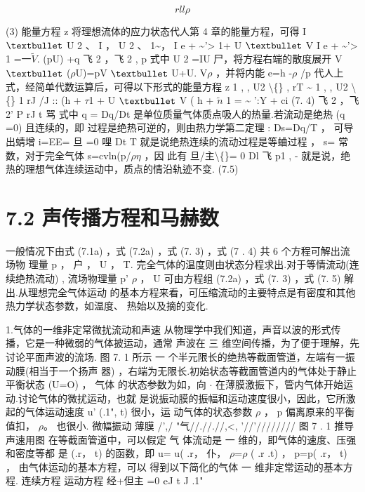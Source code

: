 \[rll\rho \]

(3) 能量方程 z 将理想流体的应力状态代人第 4 章的能量方程，可得 I ${\rm •}$ U 2 、 I ， U 2 、 1\textasciitilde{}， I e + \textasciitilde{}'> 1+ U ${\rm •}$ V I e + \textasciitilde{}'> 1 =一$\tilde{V}$. (pU) +q 飞 2 ，飞 2 , p 式中 U 2 =IU 尸，将方程右端的散度展开 V ${\rm •}$ ($\rho$U)=pV ${\rm •}$ U+U. V$\rho$ ，并将内能 e=h -$\rho$ /p 代人上式，经简单代数运算后，可得以下形式的能量方程 z 1 , , U2 \textbackslash\{\} , rT \textasciitilde{} 1 , , U2 \textbackslash\{\} 1 rJ /J :: (h + $\tau$1 + U ${\rm •}$ V ( h + $\tilde{n}$ 1 = \textasciitilde{} ':Y + ci (7. 4) 飞 2 ，飞 2' P rJ t 骂 式中 q = Dq/Dt 是单位质量气体质点吸人的热量.若流动是绝热 (q =0) 且连续的，即 过程是绝热可逆的，则由热力学第二定理 : Ds=Dq/T ， 可导出蜻增 i=EE= 旦 =0 哩 Dt T 就是说绝热连续的流动过程是等蛐过程 ， s= 常数，对于完全气体 s=cvln(p/$\rho$$\eta$ ，因 此有 旦/主\textbackslash\{\}= 0 Dl 飞 p1 , - 就是说，绝热的理想气体连续运动中，质点的情沿轨迹不变. (7.5)

\section*{7.2  声传播方程和马赫数}

一般情况下由式 (7.1a) ，式 (7.2a) ，式 (7. 3) ，式 (7 . 4) 共 6 个方程可解出流场物 理量 p ， 户 ， U ， T. 完全气体的温度则由状态分程求出.对于等情流动(连续绝热流动) , 流场物理量 p' $\rho$ ， U 可由方程组 (7.2a) ，式 (7. 3) ，式 (7. 5) 解出.从理想完全气体运动 的基本方程来看，可压缩流动的主要特点是有密度和其他热力学状态参数，如温度、 热始以及摘的变化.

1.气体的一维非定常微扰流动和声速 从物理学中我们知道，声音以波的形式传播，它是一种微弱的气体披运动，通常 声波在 三 维空间传播，为了便于理解，先讨论平面声波的流场. 图 7. 1 所示 一 个半元限长的绝热等截面管道，左端有一振动膜(相当于一个扬声 器) ，右端为无限长.初始状态等截面管道内的气体处于静止平衡状态 (U=O) ， 气体 的状态参数为如，向 $\cdot $ 在薄膜激振下，管内气体开始运动.讨论气体的微扰运动，也就 是说振动膜的振幅和运动速度很小，因此，它所激起的气体运动速度 u' (.1", t) 很小，运 动气体的状态参数 $\rho$ ， p 偏离原来的平衡值扣， $\rho$。 也很小. 微幅振动 薄膜 /',/ "气//.//.//,<, '//'//////// 图 7 . 1 推导声速用图 在等截面管道中，可以假定 气 体流动是 一 维的，即气体的速度、压强和密度等都 是 (.r， t) 的函数，即 u= u( .r， 仆， $\rho$=$\rho$ ( .r .t) ， p=p( .r， t) ， 由气体运动的基本方程，可以 得到以下简化的气体 一 维非定常运动的基本方程. 连续方程 运动方程 经+但主 =0 ${\rm e}$J t J .1"

